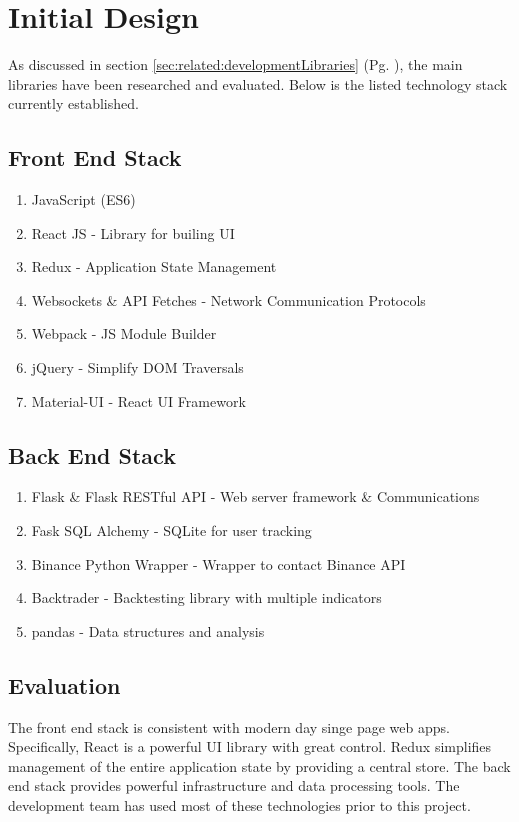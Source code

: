 %
\chapter{Initial Design}
\label{sec:design}

As discussed in section \ref{sec:related:developmentLibraries} (Pg. \pageref{sec:related:developmentLibraries}), the main libraries have been researched and evaluated. Below is the listed technology stack currently established.

\section{Front End Stack}
\label{sec:design:frontend}
\begin{enumerate}
    \item JavaScript (ES6)
    \item React JS  -   Library for builing UI
    \item Redux     -   Application State Management
    \item Websockets \& API Fetches - Network Communication Protocols
    \item Webpack   - JS Module Builder
    \item jQuery    - Simplify DOM Traversals
    \item Material-UI   - React UI Framework
\end{enumerate}

\section{Back End Stack}
\label{sec:design:backend}
\begin{enumerate}
    \item Flask \& Flask RESTful API - Web server framework \& Communications
    \item Fask SQL Alchemy          - SQLite for user tracking
    \item Binance Python Wrapper    - Wrapper to contact Binance API
    \item Backtrader                - Backtesting library with multiple indicators
    \item pandas                    - Data structures and analysis
\end{enumerate}

\section{Evaluation}
\label{sec:design:eval}

\noindent The front end stack is consistent with modern day singe page web apps. Specifically, React is a powerful UI library with great control. Redux simplifies management of the entire application state by providing a central store. The back end stack provides powerful infrastructure and data processing tools. The development team has used most of these technologies prior to this project.


